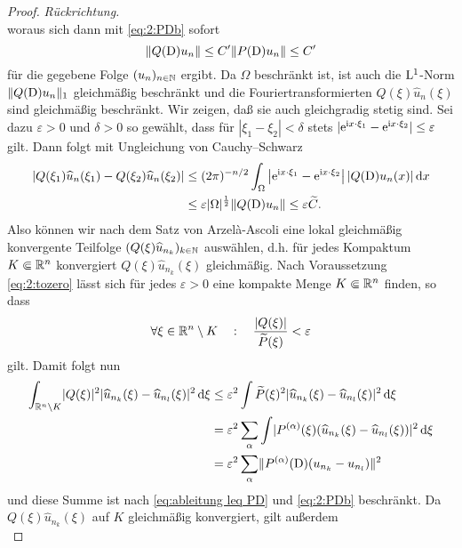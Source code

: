 \begin{proof} {\it Rückrichtung.}
\begin{equation}
\end{equation}
woraus sich dann mit \eqref{eq:2:PDb} sofort
\begin{equation}
\lVert Q(\mathrm D)u_n\rVert\leq C' \lVert P(\mathrm D)u_n\rVert \leq C' 
\end{equation}
für die gegebene Folge $(u_n)_{n\in\mathbb N}$ ergibt. Da $\Omega$ beschränkt ist, ist auch die $\mathrm L^1$-Norm $\|Q(\mathrm D)u_n\|_1$ gleichmäßig beschränkt und die 
Fouriertransformierten $Q(\xi) \widehat{u}_n(\xi)$ sind gleichmäßig beschränkt. Wir zeigen, daß sie auch gleichgradig stetig sind. Sei dazu $\varepsilon>0$ und $\delta>0$ so gewählt, dass für $|\xi_1 - \xi_2| < \delta$ stets $|\mathrm e^{\mathrm i x \cdot \xi_1} - \mathrm e^{\mathrm i x \cdot \xi_2}|\le\varepsilon$ gilt. Dann folgt mit Ungleichung von Cauchy--Schwarz 
\begin{align}
| Q(\xi_1)\widehat{u}_n(\xi_1) - Q(\xi_2)\widehat{u}_n(\xi_2)| & \leq (2\pi)^{-n/2} \int_{\Omega} \left| \mathrm e^{\mathrm i x \cdot \xi_1} - \mathrm e^{\mathrm i x \cdot \xi_2} \right| | Q(\mathrm D) u_n(x)| \,\mathrm d x \notag
\\ & \leq \varepsilon |\Omega|^{\frac{1}{2}} \Vert Q(\mathrm D)u_n \Vert \leq \varepsilon \widetilde{C}.
\end{align}
Also können wir nach dem Satz von Arzel\`a-Ascoli eine lokal gleichmäßig konvergente Teilfolge $(Q(\xi)\widehat{u}_{n_k})_{k\in\mathbb N}$ auswählen, d.h. für jedes Kompaktum $K\Subset\mathbb R^n$ konvergiert $Q(\xi)\widehat{u}_{n_k}(\xi)$ gleichmäßig.
Nach Voraussetzung \eqref{eq:2:tozero} lässt sich für jedes $\varepsilon > 0$ eine kompakte Menge $K \Subset \mathbb R^n$ finden, so dass 
\begin{equation}
\forall \xi\in\mathbb R^n\setminus K \quad:\quad \frac{\lvert Q(\xi)\rvert}{\widetilde{P}(\xi)} <\varepsilon
\end{equation}
gilt. Damit folgt nun
\begin{align}
\int_{\mathbb R^n\setminus K}\lvert Q(\xi)\rvert^2\lvert\widehat{u}_{n_k}(\xi)-\widehat{u}_{n_l}(\xi)\rvert^2\,\mathrm d \xi
&\leq\varepsilon^2\int\widetilde{P}(\xi)^2\lvert\widehat{u}_{n_k}(\xi)-\widehat{u}_{n_l}(\xi)\rvert^2\,\mathrm d \xi\notag\\
&=\varepsilon^2\sum_\alpha \int  \lvert P^{(\alpha)}(\xi) (\widehat{u}_{n_k}(\xi)-\widehat{u}_{n_l}(\xi) ) \rvert^2\,\mathrm d \xi\notag\\
&=\varepsilon^2\sum_\alpha \lVert P^{(\alpha)}(\mathrm D)(u_{n_k}-u_{n_l})\rVert^2\label{eq:2:Kcsum}
\end{align}
und diese Summe ist nach \eqref{eq:ableitung leq PD} und \eqref{eq:2:PDb} beschränkt.
Da $Q(\xi)\widehat u_{n_k}(\xi)$ auf $K$ gleichmäßig konvergiert, gilt außerdem
\begin{equation}

\end{equation}
\end{proof}
